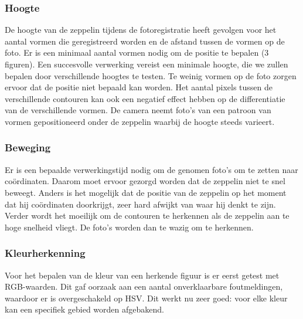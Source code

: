 \documentclass[eind]{penoverslag}
\begin{document}
\subsubsection{Hoogte}
De hoogte van de zeppelin tijdens de fotoregistratie heeft gevolgen voor het aantal vormen die geregistreerd worden en de afstand tussen de vormen op de foto. Er is een minimaal aantal vormen nodig om de positie te bepalen (3 figuren). Een succesvolle verwerking vereist een minimale hoogte, die we zullen bepalen door verschillende hoogtes te testen. Te weinig vormen op de foto zorgen ervoor dat de positie niet bepaald kan worden. Het aantal pixels tussen de verschillende contouren kan ook een negatief effect hebben op de differentiatie van de verschillende vormen. De camera neemt foto’s van een patroon van vormen gepositioneerd onder de zeppelin waarbij de hoogte steeds varieert.\\
\subsubsection{Beweging}
Er is een bepaalde verwerkingstijd nodig om de genomen foto's om te zetten naar co\"ordinaten. Daarom moet ervoor gezorgd worden dat de zeppelin niet te snel beweegt. Anders is het mogelijk dat de positie van de zeppelin op het moment dat hij co\"ordinaten doorkrijgt, zeer hard afwijkt van waar hij denkt te zijn. Verder wordt het moeilijk om de contouren te herkennen als de zeppelin aan te hoge snelheid vliegt. De foto's worden dan te wazig om te herkennen.

\subsubsection{Kleurherkenning}
Voor het bepalen van de kleur van een herkende figuur is er eerst getest met RGB-waarden. Dit gaf oorzaak aan een aantal onverklaarbare foutmeldingen, waardoor er is overgeschakeld op HSV. Dit werkt nu zeer goed: voor elke kleur kan een specifiek gebied worden afgebakend. 
\end{document}
